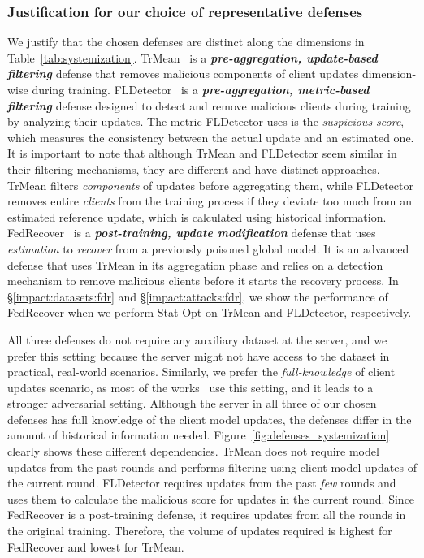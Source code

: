 \subsubsection{Justification for our choice of representative defenses}\label{systemization:defenses_study:justification}
We justify that the chosen defenses are distinct along the dimensions in Table~\ref{tab:systemization}.
TrMean~\cite{yin2018byzantine} is a \textbf{\emph{pre-aggregation, update-based filtering}} defense that removes malicious components of client updates dimension-wise during training. FLDetector~\cite{zhang2022fldetector} is a \textbf{\emph{pre-aggregation, metric-based filtering}} defense designed to detect and remove malicious clients during training by analyzing their updates. The metric FLDetector uses is the \emph{suspicious score}, which measures the consistency between the actual update and an estimated one. It is important to note that although TrMean and FLDetector seem similar in their filtering mechanisms, they are different and have distinct approaches. TrMean filters \emph{components} of updates before aggregating them, while FLDetector removes entire \emph{clients} from the training process if they deviate too much from an estimated reference update, which is calculated using historical information. FedRecover~\cite{cao2022fedrecover} is a \textbf{\emph{post-training, update modification}} defense that uses \emph{estimation} to \emph{recover} from a previously poisoned global model. It is an advanced defense that uses TrMean in its aggregation phase and relies on a detection mechanism to remove malicious clients before it starts the recovery process. In \S\ref{impact:datasets:fdr} and \S\ref{impact:attacks:fdr}, we show the performance of FedRecover when we perform Stat-Opt on TrMean and FLDetector, respectively.

All three defenses do not require any auxiliary dataset at the server, and we prefer this setting because the server might not have access to the dataset in practical, real-world scenarios. Similarly, we prefer the \emph{full-knowledge} of client updates scenario, as most of the works~\cite{cao2022flcert, blanchard2017machine, li2020learning, li2021ditto, park2021sageflow, cao2020fltrust} use this setting, and it leads to a stronger adversarial setting. Although the server in all three of our chosen defenses has full knowledge of the client model updates, the defenses differ in the amount of historical information needed. Figure~\ref{fig:defenses_systemization} clearly shows these different dependencies. TrMean does not require model updates from the past rounds and performs filtering using client model updates of the current round. FLDetector requires updates from the past \emph{few} rounds and uses them to calculate the malicious score for updates in the current round. Since FedRecover is a post-training defense, it requires updates from all the rounds in the original training. Therefore, the volume of updates required is highest for FedRecover and lowest for TrMean.


